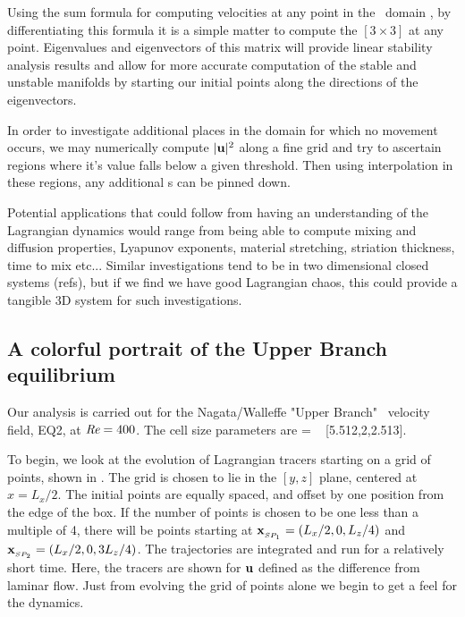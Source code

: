 \documentclass[letter,10pt,openany]{article}
\begin{document}
Using the sum formula for computing velocities at
any point in the \pCf\ domain , by differentiating this formula it is a simple
matter to compute the $[3\!\times\! 3]$ {\velgradmat}
at any point. Eigenvalues and eigenvectors of this matrix will
provide linear stability analysis results and allow for more accurate computation of the stable
and unstable manifolds by starting our initial points along the directions of the eigenvectors. 


 In order to investigate additional places in the domain for which no movement occurs, we may numerically compute $|{\bf u}|^{2}$ along a fine
grid and try to ascertain regions where it's value falls below a given threshold. Then
using interpolation in these regions, any additional  \stagp s can be
pinned down. 

Potential applications that could follow from having an understanding of the Lagrangian dynamics would range from being able to compute mixing
and diffusion properties, Lyapunov exponents, material stretching,
striation thickness, time to mix etc... Similar investigations tend to be in two dimensional closed systems (refs), but if we find we
have good Lagrangian chaos, this could provide a tangible 3D system for such investigations.






\subsection{A colorful portrait of the Upper Branch equilibrium}
\label{sec:eq2}


Our analysis is carried out for the Nagata/Walleffe
"Upper Branch" \eqv\ velocity field, EQ2, at $\textit{Re} = 400$.
The cell size parameters are \beq   [L_x,2,L_z]
         = \; [2\pi/1.14,2,4\pi/5]
         ~ [5.512,2,2.513].
\label{cellW03}
\eeq

To begin, we look at the evolution of Lagrangian tracers starting on a grid of points, shown in . The grid
is chosen to lie in the $[y,z]$ plane, centered at $x = L_x/2$. The initial
points are equally spaced, and offset by one position from the edge
of the box. If the number of points is chosen to be one less than a
multiple of 4, there will be points starting at $\bold{x}_{_{SP_{1}}}=(L_x/2,0,L_z/4)$ and
$\bold{x}_{_{SP_{2}}}=(L_x/2,0,3L_z/4)$. The
trajectories are integrated and run for a relatively short time. Here, the tracers are shown for ${\bf u}$ defined as the difference from laminar flow. Just from evolving the grid of points alone we begin to get a feel for the dynamics.
\end{document}
